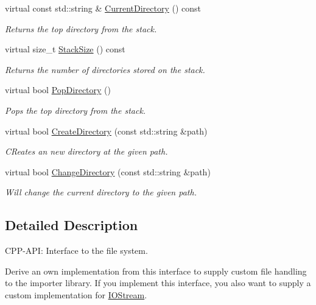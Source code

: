 \begin{CompactItemize}
virtual const std::string \& \hyperlink{class_assimp_1_1_i_o_system_9b30a76a279c6559488bdef10d5c2315}{CurrentDirectory} () const 
\begin{CompactList}\small\item\em Returns the top directory from the stack. \item\end{CompactList}\item 
virtual size\_\-t \hyperlink{class_assimp_1_1_i_o_system_439587c95c2ff6307e075b2437a12176}{StackSize} () const 
\begin{CompactList}\small\item\em Returns the number of directories stored on the stack. \item\end{CompactList}\item 
virtual bool \hyperlink{class_assimp_1_1_i_o_system_a00f3ee1c44576364e8ce00206fb9dd2}{PopDirectory} ()
\begin{CompactList}\small\item\em Pops the top directory from the stack. \item\end{CompactList}\item 
virtual bool \hyperlink{class_assimp_1_1_i_o_system_3fc1316fdb4168cde052c95f96364d41}{CreateDirectory} (const std::string \&path)
\begin{CompactList}\small\item\em CReates an new directory at the given path. \item\end{CompactList}\item 
virtual bool \hyperlink{class_assimp_1_1_i_o_system_93e80760bd5d5239ba8eab3bd31efa6b}{ChangeDirectory} (const std::string \&path)
\begin{CompactList}\small\item\em Will change the current directory to the given path. \item\end{CompactList}\end{CompactItemize}


\subsection{Detailed Description}
CPP-API: Interface to the file system. 

Derive an own implementation from this interface to supply custom file handling to the importer library. If you implement this interface, you also want to supply a custom implementation for \hyperlink{class_assimp_1_1_i_o_stream}{IOStream}.

